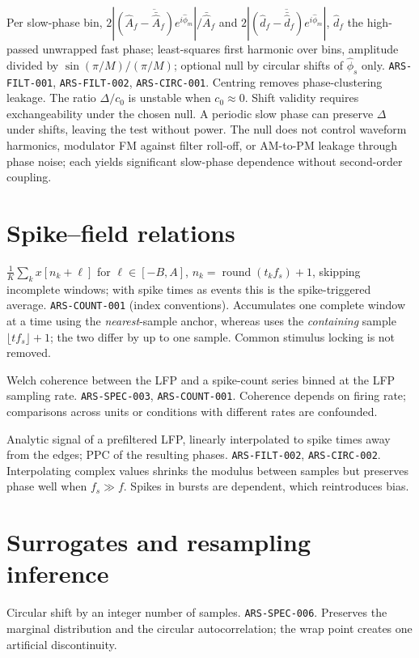{Per slow-phase bin, $2|\overline{(\hat A_f-\bar{\hat A}_f)e^{i\hat\phi_m}}|/\bar{\hat A}_f$ and $2|\overline{(\hat d_f-\bar{\hat d}_f)e^{i\hat\phi_m}}|$, $\hat d_f$ the high-passed unwrapped fast phase; least-squares first harmonic over bins, amplitude divided by $\sin(\pi/M)/(\pi/M)$; optional null by circular shifts of $\hat\phi_s$ only.}
{\texttt{ARS-FILT-001}, \texttt{ARS-FILT-002}, \texttt{ARS-CIRC-001}.}
{Centring removes phase-clustering leakage. The ratio $\Delta/c_0$ is unstable when $c_0\approx0$. Shift validity requires exchangeability under the chosen null. A periodic slow phase can preserve $\Delta$ under shifts, leaving the test without power. The null does not control waveform harmonics, modulator FM against filter roll-off, or AM-to-PM leakage through phase noise; each yields significant slow-phase dependence without second-order coupling.}

\section{Spike--field relations}
{$\frac1K\sum_kx[n_k+\ell]$ for $\ell\in[-B,A]$, $n_k=\operatorname{round}(t_kf_s)+1$, skipping incomplete windows; with spike times as events this is the spike-triggered average.}
{\texttt{ARS-COUNT-001} (index conventions).}
{Accumulates one complete window at a time using the \emph{nearest}-sample anchor, whereas  uses the \emph{containing} sample $\lfloor t f_s\rfloor+1$; the two differ by up to one sample. Common stimulus locking is not removed.}

{Welch coherence between the LFP and a spike-count series binned at the LFP sampling rate.}
{\texttt{ARS-SPEC-003}, \texttt{ARS-COUNT-001}.}
{Coherence depends on firing rate; comparisons across units or conditions with different rates are confounded.}

{Analytic signal of a prefiltered LFP, linearly interpolated to spike times away from the edges; PPC of the resulting phases.}
{\texttt{ARS-FILT-002}, \texttt{ARS-CIRC-002}.}
{Interpolating complex values shrinks the modulus between samples but preserves phase well when $f_s\gg f$. Spikes in bursts are dependent, which reintroduces bias.}

\section{Surrogates and resampling inference}
{Circular shift by an integer number of samples.}
{\texttt{ARS-SPEC-006}.}
{Preserves the marginal distribution and the circular autocorrelation; the wrap point creates one artificial discontinuity.}

